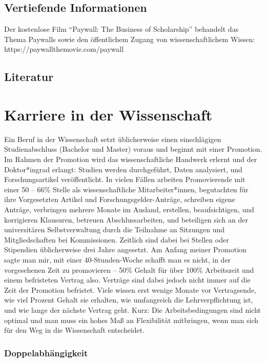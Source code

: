 \documentclass[
  letterpaper,
  DIV=11,
  numbers=noendperiod]{scrreprt}
\begin{document}
\section{Vertiefende Informationen}\label{vertiefende-informationen}

Der kostenlose Film ``Paywall: The Business of Scholarship'' behandelt
das Thema Paywalls sowie den öffentlichem Zugang von wissenschaftlichem
Wissen: https://paywallthemovie.com/paywall

\section{Literatur}\label{literatur-6}

\chapter{Karriere in der
Wissenschaft}\label{karriere-in-der-wissenschaft}

Ein Beruf in der Wissenschaft setzt üblicherweise einen einschlägigen
Studienabschluss (Bachelor und Master) voraus und beginnt mit einer
Promotion. Im Rahmen der Promotion wird das wissenschaftliche Handwerk
erlernt und der Doktor*ingrad erlangt: Studien werden durchgeführt,
Daten analysiert, und Forschungsartikel veröffentlicht. In vielen Fällen
arbeiten Promovierende mit einer 50 -- 66\% Stelle als wissenschaftliche
Mitarbeiter*innen, begutachten für ihre Vorgesetzten Artikel und
Forschungsgelder-Anträge, schreiben eigene Anträge, verbringen mehrere
Monate im Ausland, erstellen, beaufsichtigen, und korrigieren Klausuren,
betreuen Abschlussarbeiten, und beteiligen sich an der universitären
Selbstverwaltung durch die Teilnahme an Sitzungen und Mitgliedschaften
bei Kommissionen. Zeitlich sind dabei bei Stellen oder Stipendien
üblicherweise drei Jahre angesetzt. Am Anfang meiner Promotion sagte man
mir, mit einer 40-Stunden-Woche schafft man es nicht, in der
vorgesehenen Zeit zu promovieren -- 50\% Gehalt für über 100\%
Arbeitszeit und einem befristeten Vertrag also. Verträge sind dabei
jedoch nicht immer auf die Zeit der Promotion befristet. Viele wissen
erst wenige Monate vor Vertragsende, wie viel Prozent Gehalt sie
erhalten, wie umfangreich die Lehrverpflichtung ist, und wie lange der
nächste Vertrag geht. Kurz: Die Arbeitsbedingungen sind nicht optimal
und man muss ein hohes Maß an Flexibilität mitbringen, wenn man sich für
den Weg in die Wissenschaft entscheidet.

\subsection{Doppelabhängigkeit}\label{doppelabhuxe4ngigkeit}
\end{document}
